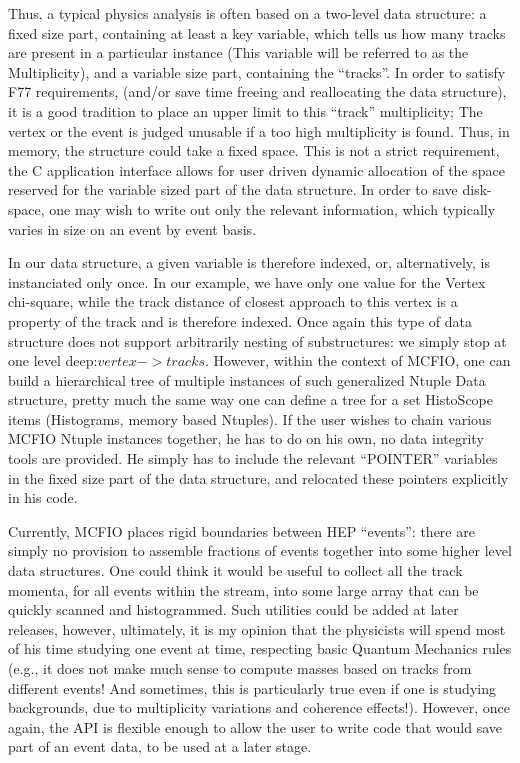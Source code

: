 Thus, a typical physics analysis is often based on a two-level  data structure:
a fixed size  part, containing at least a key variable, which   tells us how
many tracks are present in a particular instance (This variable will be referred
to as the Multiplicity), and a variable size part, containing the ``tracks''. In
order to satisfy F77 requirements,  (and/or save  time freeing and reallocating
the data structure), it is a good  tradition to place an upper limit to this
``track'' multiplicity;  The vertex or the event is judged unusable if
a too high multiplicity is found. Thus, in memory,  the structure could take a
fixed space. This is not a strict requirement, the C application interface
allows for  user driven dynamic allocation of the space reserved for the
variable sized part of the data structure.  In order to save disk-space, one
may wish to write out only the relevant information, which typically varies
in size on an event by event basis.

In our data structure, a given variable is therefore indexed, or, alternatively,  is
instanciated only once. In our example, we have only one value for the  Vertex
chi-square, while the track distance of closest approach to this  vertex is a
property of the track and is therefore indexed. Once again this type of data
structure does not support arbitrarily nesting of substructures:  we simply stop
at one level deep:$vertex -> tracks$. However, within the context of MCFIO,  one
can build a hierarchical tree of multiple instances of such generalized  Ntuple
Data structure, pretty much the same way one can define a tree for  a set
HistoScope items (Histograms, memory based Ntuples).  If the user  wishes to
chain various MCFIO Ntuple instances together, he has to do on his own, no
data integrity tools are provided.  He simply has to include the relevant
``POINTER'' variables in the fixed size part of the data structure, and
relocated these pointers explicitly in his code.

Currently, MCFIO places rigid boundaries between HEP ``events'':  there are
simply no provision to assemble fractions of events together into some
higher level data structures. One could think it would be useful to collect all the track
momenta, for all events within the stream, into some large array that can be
quickly scanned and histogrammed.  Such utilities could be added at later
releases, however, ultimately, it is my opinion that the physicists will spend
most of his time studying  one event at time, respecting basic Quantum
Mechanics rules (e.g., it does not  make much sense to compute masses based on
tracks from different events! And  sometimes, this is particularly true even if
one is studying backgrounds, due to  multiplicity variations and coherence
effects!).  However, once again, the API is flexible enough to allow the user
to write code that would save part of an event data, to be used at a later
stage.

